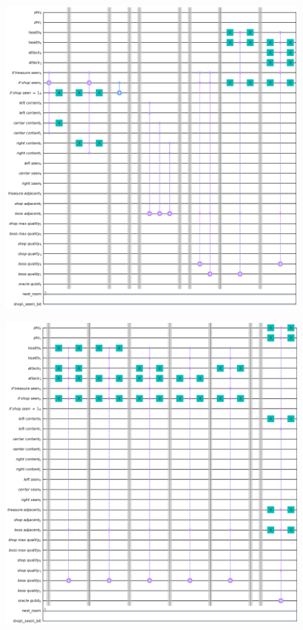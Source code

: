 \documentclass{book}
\theoremstyle{definition}
\theoremstyle{definition}
\theoremstyle{definition}
\theoremstyle{plain}
\theoremstyle{plain}
\theoremstyle{plain}
\theoremstyle{plain}
\begin{document}
\begin{figure}[H]
\begin{center}
    \includegraphics[width=16cm]{immagini_circuito_8_stanze/mega_circ_4.png}
\end{center}
\end{figure}

\begin{figure}[H]
\begin{center}
    \includegraphics[width=16cm]{immagini_circuito_8_stanze/mega_circ_5.png}
\end{center}
\end{figure}
\end{document}
